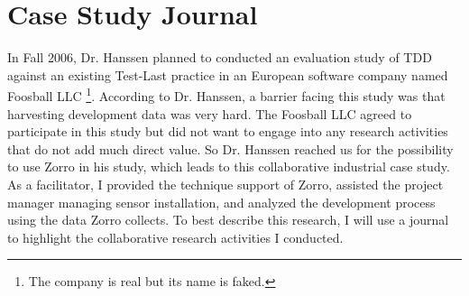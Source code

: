 



\section{Case Study Journal}
\label{sec:Industry-Journal}

In Fall 2006, Dr. Hanssen planned to conducted an evaluation study of TDD against an existing Test-Last practice in an European software company named Foosball LLC \footnote{The company is real but its name is faked.}. According to Dr. Hanssen, a barrier facing this study was that harvesting development data was very hard. The Foosball LLC agreed to participate in this study but did not want to engage into any research activities that do not add much direct value. So Dr. Hanssen reached us for the possibility to use Zorro in his study, which leads to this collaborative industrial case study. As a facilitator, I provided the technique support of Zorro, assisted the project manager managing sensor installation, and analyzed the development process using the data Zorro collects. To best describe this research, I will use a journal to highlight the collaborative research activities I conducted. 

